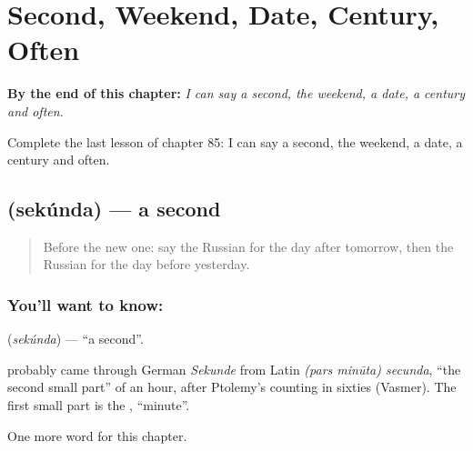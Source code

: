 
\chapter{Second, Weekend, Date, Century, Often}
\label{ch:ru-second-weekend-date-century-often}

\begin{chapteropening}
\textbf{By the end of this chapter:} \emph{I can say a second, the weekend, a date, a century and often.}

Complete the last lesson of chapter 85: I can say a second, the weekend, a date, a century and often.
\end{chapteropening}

\section[\texorpdfstring{\ru{секунда} (sekúnda)}{секунда (sekúnda)}]{ (sekúnda) — a second}

\label{lesson:RU-C85-second}



\begin{quote}
Before the new one: say the Russian for the day after tomorrow, then the Russian for the day before yesterday.
\end{quote}

\subsection*{You'll want to know: }
\textbf{} (\emph{sekúnda}) — \textquotedblleft{}a second\textquotedblright{}.

\begin{cousinweb}
\textbf{} probably came through German \emph{Sekunde} from Latin \emph{(pars minūta) secunda}, \textquotedblleft{}the second small part\textquotedblright{} of an hour, after Ptolemy's counting in sixties (Vasmer). The first small part is the \emph{}, \textquotedblleft{}minute\textquotedblright{}.
\end{cousinweb}

\begin{grammarlens}[title={What you've built}]
One more word for this chapter.
\end{grammarlens}

